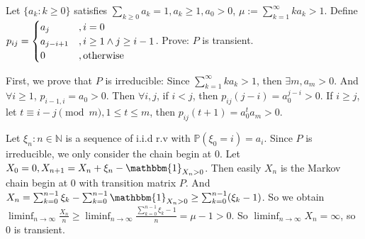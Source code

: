 \documentclass[../main]{subfiles}
\begin{document}
\begin{problem}\label{pro:8}
  Let \(\{a_k:k \geq 0\}\) satisfies \(\sum_{k \geq 0}a_k =1, a_k \geq 1, a_0 >0\), \(\mu :=\sum_{k=1}^{\infty} ka_k >1\).
  Define \(p_{ij}=
  \begin{cases}
    a_j         & , i =0                    \\
    a_{j-i + 1} & ,i \geq 1 \wedge j \geq i-1 \\
    0           & ,\text{otherwise}
  \end{cases}
  \).
  Prove: \(P\) is transient.
\end{problem}
\begin{solution}
  First, we prove that \(P\) is irreducible: Since \(\sum_{k=1}^{\infty} ka_k > 1\), then \(\exists m,a_m >0\).
  And \(\forall i \geq 1\), \( p_{i-1,i}=a_0 >0\). Then \(\forall i,j \), if \(i < j\), then \(p_{ij}(j-i)=a_0^{j-i}>0\).
  If \(i \geq j\), let \(t \equiv i-j \pmod{m}, 1 \leq t \leq m\), then \(p_{ij}(t + 1)=a_0^{t}a_m >0\).

  Let \(\xi_n :n \in \mathbb{N}\) is a sequence of i.i.d r.v with \(\mathbb{P}(\xi_0=i)=a_i\).
  Since \(P\) is irreducible, we only consider the chain begin at \(0\).
  Let \(X_0=0,X_{n+1}=X_n+\xi_n-\mathbbm{1}_{X_n>0}\).
  Then easily \(X_n\) is the Markov chain begin at \(0\) with transition matrix \(P\).
  And \(X_{n}=\sum_{k=0}^{n-1} \xi_k -\sum_{k=0}^{n-1} \mathbbm{1}_{X_n>0} \geq \sum_{k=0}^{n-1} (\xi_k-1)\).
  So we obtain \(\liminf_{n \to \infty}\frac{X_n}{n} \geq \liminf_{n \to \infty}\frac{\sum_{k=0}^{n-1} \xi_k-1}{n}=\mu-1>0\).
  So \(\liminf_{n \to \infty}X_n=\infty\), so \(0\) is transient.
\end{solution}
\end{document}
